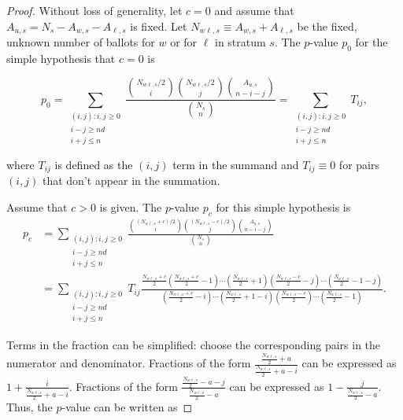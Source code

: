 \begin{proof}
Without loss of generality, let $c=0$ and assume that $A_{u,s}=N_s - A_{w,s} - A_{\ell,s}$ is fixed.
Let $N_{w\ell, s} \equiv A_{w,s}+A_{\ell,s}$ be the fixed, unknown number of ballots for $w$ or for $\ell$ in stratum $s$.
The $p$-value $p_0$ for the simple hypothesis that $c=0$ is

\begin{equation}
  p_0 = \sum_{\substack{(i, j) :  i, j\ge 0 \\ i-j \geq nd \\ i+j \leq n}} \frac{ {N_{w\ell, s}/2 \choose i}{N_{w\ell, s}/2 \choose j}{A_{u,s} \choose n-i-j}}{{N_s \choose n}} =  \sum_{\substack{(i, j) :  i, j\ge 0 \\ i-j \geq nd \\ i+j \leq n}}T_{ij},
\end{equation}

where $T_{ij}$ is defined as the $(i, j)$ term in the summand and $T_{ij} \equiv 0$ for pairs $(i, j)$ that don't appear in the summation.

Assume that $c>0$ is given.
The $p$-value $p_c$ for this simple hypothesis is
\begin{align*}
p_c &=   \sum_{\substack{(i, j) :  i, j\ge 0 \\ i-j \geq nd \\ i+j \leq n}} \frac{ {(N_{w\ell, s}+c)/2 \choose i}{(N_{w\ell, s}-c)/2 \choose j}{A_{u,s} \choose n-i-j}}{{N_s \choose n}}  \\
   &= \sum_{\substack{(i, j) :  i, j\ge 0 \\ i-j \geq nd \\ i+j \leq n}}T_{ij} \frac{ \frac{N_{w\ell, s}+c}{2}(\frac{N_{w\ell, s}+c}{2}-1)\cdots(\frac{N_{w\ell, s}}{2}+1) (\frac{N_{w\ell, s}-c}{2} -j)\cdots(\frac{N_{w\ell, s}}{2}-1-j) }
   {(\frac{N_{w\ell, s}+c}{2} -i)\cdots(\frac{N_{w\ell, s}}{2}+1-i)(\frac{N_{w\ell, s}-c}{2})\cdots(\frac{N_{w\ell, s}}{2}-1)}.
\end{align*}

Terms in the fraction can be simplified: choose the corresponding pairs in the numerator and denominator.
Fractions of the form $\frac{\frac{N_{w\ell, s}}{2} + a}{\frac{N_{w\ell,s}}{2} + a - i}$ can be expressed as $1 + \frac{i}{\frac{N_{w\ell,s}}{2} + a-i}$.
Fractions of the form $\frac{\frac{N_{w\ell, s}}{2}  - a - j}{\frac{N_{w\ell, s}}{2}  - a}$ can be expressed as $1 - \frac{j}{\frac{N_{w\ell, s}}{2} -a}$.
Thus, the $p$-value can be written as 


\end{proof}
